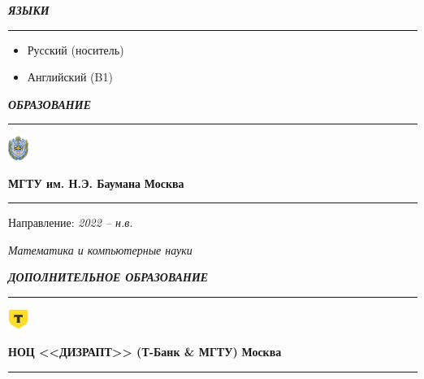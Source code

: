 \documentclass[a4paper, 10pt]{extarticle}
\newcommand{\Scale}{1.25}
\newcommand{\Sep}{
    \noindent\hdashrule[0.5ex]{\columnwidth}{1pt}{1mm 1pt}
}
\begin{document}
\begin{paracol}{2}
\begin{leftcolumn}
            \Sep
            \begin{center}
                \textbf{\textit{ЯЗЫКИ}}
                \vspace{-1.25em}

                \rule{5em}{1pt}
            \end{center}
            \vspace{-1em}
            \begin{itemize}[
                label=\textcolor{black}{\scalebox{\Scale}{\textbullet}},
                topsep=0cm,
                leftmargin=0.275cm,
                itemsep=0.1cm
            ]
                \item Русский (носитель)
                \item Английский (B1)
            \end{itemize}
        \end{leftcolumn}

        \switchcolumn[1]
        \begin{rightcolumn}
            
            \Sep
            \begin{center}
                \textbf{\textit{ОБРАЗОВАНИЕ}}
                \vspace{-1.25em}

                \rule{5em}{1pt}
            \end{center}
            \vspace{-1em}
            \noindent\parbox{0.1\columnwidth}{
                \includegraphics[width=0.05\textwidth]{img/bmstu_logo.png}
            }
            \parbox{0.89\columnwidth}{
                \textbf{МГТУ им. Н.Э. Баумана}
                \hfill \textbf{Москва}
                \hrule
                \vspace{0.5em}

                Направление: \hfill \textit{2022 -- н.в.} 
                
                \textit{Математика и компьютерные науки}
            }

            \Sep
            \begin{center}
                \textbf{\textit{ДОПОЛНИТЕЛЬНОЕ ОБРАЗОВАНИЕ}}
                \vspace{-1.25em}

                \rule{5em}{1pt}
            \end{center}
            \vspace{-1em}
            \noindent\parbox{0.09\columnwidth}{
                \includegraphics[width=0.05\textwidth]{img/tbank_logo.png}
            }
            \parbox{0.9\columnwidth}{
                \textbf{НОЦ <<ДИЗРАПТ>> (Т-Банк \& МГТУ)}
                \hfill \textbf{Москва}
                \hrule
                \vspace{0.5em}

}
\end{rightcolumn}
\end{paracol}
\end{document}
